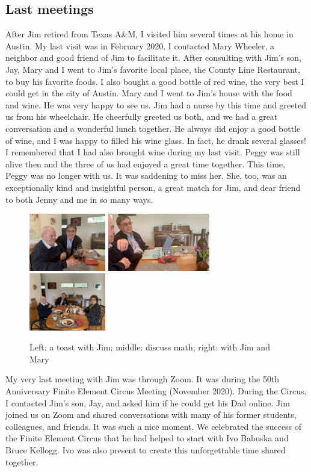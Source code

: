 \documentclass[CJK,11pt]{amsart}
\theoremstyle{definition}
\begin{document}
\begin{CJK*}{UTF8}{gbsn}
\section{Last meetings}
After Jim retired from Texas A\&M, I visited him several times at his home in Austin. My last visit was in February 2020. I contacted Mary Wheeler, a neighbor and good friend of Jim to facilitate it. After consulting with Jim's son, Jay, Mary and I went to Jim's favorite local place, the County Line Restaurant, to buy his favorite foods. I also bought a good bottle of red wine, the very best I could get in the city of Austin. Mary and I went to Jim's house with the food and wine. He was very happy to see us. Jim had a nurse by this time and greeted us from his wheelchair. He cheerfully greeted us both, and we had a great conversation and a wonderful lunch together. He always did enjoy a good bottle of wine, and I was happy to filled his wine glass. In fact, he drank several glasses! I remembered that I had also brought wine during my last visit. Peggy was still alive then and the three of us had enjoyed a great time together. This time, Peggy was no longer with us. It was saddening to miss her. She, too, was an exceptionally kind and insightful person, a great match for Jim, and dear friend to both Jenny and me in so many ways. 
\begin{figure}[h]
 \includegraphics[height=2.5cm]{VisitJimHome20200224/JimJinchao20200224.jpeg}
 \includegraphics[height=2.5cm]{VisitJimHome20200224/Convolution20200224.jpeg}
 \includegraphics[height=2.5cm]{VisitJimHome20200224/JimMaryJinchao20200224.jpeg}
 \caption{\tiny Left: a toast with Jim; middle: discuss math; right: with Jim and Mary}\label{Fig2}
\end{figure}
My very last meeting with Jim was through Zoom. It was during the 50th Anniversary Finite Element Circus Meeting (November 2020). During the Circus, I contacted Jim's son, Jay, and asked him if he could get his Dad online. Jim joined us on Zoom and shared conversations with many of his former students, colleagues, and friends. It was such a nice moment. We celebrated the success of the Finite Element Circus that he had helped to start with Ivo Babuska  and Bruce Kellogg.  Ivo was also present to create this unforgettable time shared together.

\end{CJK*}
\end{document}
